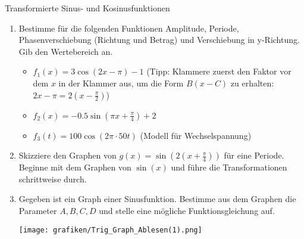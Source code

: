 \begin{aufgabenumgebung}{Transformierte Sinus- und Kosinusfunktionen}
\begin{enumerate}
    \item Bestimme für die folgenden Funktionen Amplitude, Periode, Phasenverschiebung (Richtung und Betrag) und Verschiebung in y-Richtung. Gib den Wertebereich an.
        \begin{itemize}
            \item $f_1(x) = 3 \cos(2x - \pi) - 1$ (Tipp: Klammere zuerst den Faktor vor dem $x$ in der Klammer aus, um die Form $B(x-C)$ zu erhalten: $2x-\pi = 2(x-\frac{\pi}{2})$)
            \item $f_2(x) = -0.5 \sin(\pi x + \frac{\pi}{4}) + 2$
            \item $f_3(t) = 100 \cos(2\pi \cdot 50 t)$ (Modell für Wechselspannung)
        \end{itemize}
    \item Skizziere den Graphen von $g(x) = \sin(2(x+\frac{\pi}{4}))$ für eine Periode. Beginne mit dem Graphen von $\sin(x)$ und führe die Transformationen schrittweise durch.
    \item Gegeben ist ein Graph einer Sinusfunktion. Bestimme aus dem Graphen die Parameter $A, B, C, D$ und stelle eine mögliche Funktionsgleichung auf.
        \begin{center}
            \texttt{[image: grafiken/Trig\_Graph\_Ablesen(1).png]}
            \label{fig:graph_ablesen}
        \end{center}
\end{enumerate}
\end{aufgabenumgebung}

